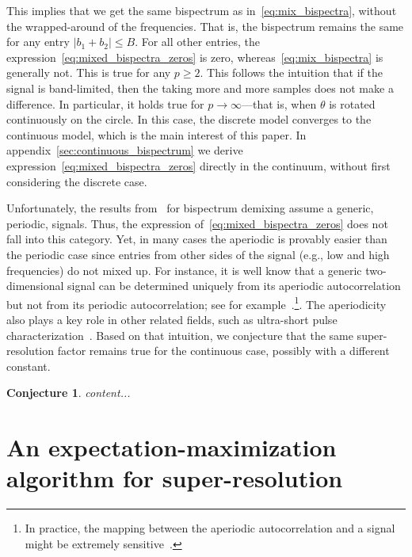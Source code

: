 \documentclass[english,12pt]{article}
\newcommand{\TODO}[1]{{\color{red}{[#1]}}}
\numberwithin{equation}{section}
\numberwithin{mytheorem}{section} %
\newtheorem{conj}[mytheorem]{Conjecture}
\begin{document}
This implies that we get the same bispectrum as in~\eqref{eq:mix_bispectra}, without the wrapped-around of the frequencies. 
That is, the bispectrum remains the same for any entry $\vert b_1 + b_2\vert \leq B$. For all other entries, the expression~\eqref{eq:mixed_bispectra_zeros} is zero, whereas~\eqref{eq:mix_bispectra} is generally not. 
This is true for any $p\geq 2$. 
This follows the intuition that if the signal is band-limited, then the taking more and more samples does not make a difference. \TODO{Does it?} 
In particular, it holds true for $p\to\infty$---that is, when $\theta$ is rotated continuously on the circle. In this case, the discrete model converges to the continuous model, which is the main interest of this paper. In appendix~\ref{sec:continuous_bispectrum} we derive expression~\eqref{eq:mixed_bispectra_zeros} directly in the continuum, without first considering the discrete case. 

Unfortunately, the results from~\cite{bandeira2017estimation} for bispectrum demixing assume a generic, periodic, signals. Thus, the expression of~\eqref{eq:mixed_bispectra_zeros} does not fall into this category. Yet, in many cases the aperiodic is provably easier than the periodic case since entries from other sides of the signal (e.g.,
low and high frequencies) do not mixed up. 
For instance, it is well know that a generic two-dimensional signal can be determined uniquely from its aperiodic autocorrelation but not from its periodic autocorrelation; see for example~\cite{hayes1982reconstruction}.\footnote{In practice, the mapping between the aperiodic autocorrelation and a signal might be extremely sensitive~\cite{barnett2018geometry}.}. The aperiodicity also plays a key role in other related fields, such as ultra-short pulse characterization~\cite{bendory2018signal}. 
Based on that intuition, we conjecture that the same super-resolution factor remains true for the continuous case, possibly with a different constant. 

\begin{conj}
	content...
\end{conj}

\section{An expectation-maximization algorithm for super-resolution}
\end{document}
